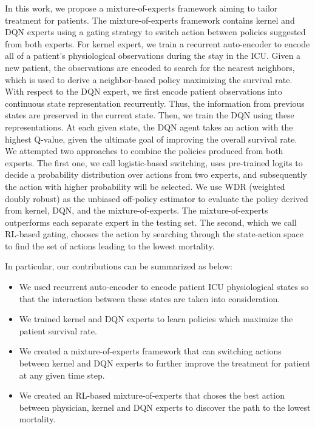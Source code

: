 \documentclass[letterpaper]{article}
\begin{document}
In this work, we propose a mixture-of-experts framework aiming to tailor treatment for patients. The mixture-of-experts framework contains kernel and DQN experts using a gating strategy to switch action between policies suggested from both experts. For kernel expert, we train a recurrent auto-encoder to encode all of a patient's physiological observations during the stay in the ICU. Given a new patient, the  observations are encoded to search for the nearest neighbors, which is used to derive a neighbor-based policy maximizing the survival rate. With respect to the DQN expert, we first encode patient observations into continuous state representation recurrently. Thus, the information from previous states are preserved in the current state. Then, we train the DQN using these representations. At each given state, the DQN agent takes an action with the highest Q-value, given the ultimate goal of improving the overall survival rate. We attempted two approaches to combine the policies produced from both experts. The first one, we call logistic-based switching, uses pre-trained logits to decide a probability distribution over actions from two experts, and subsequently the action with higher probability will be selected. We use WDR (weighted doubly robust) \cite{thomas2016data} as the unbiased off-policy estimator to evaluate the policy derived from kernel, DQN, and the mixture-of-experts. The mixture-of-experts outperforms each separate expert in the testing set. The second, which we call RL-based gating, chooses the action by searching through the state-action space to find the set of actions leading to the lowest mortality. 

In particular, our contributions can be summarized as below:

\begin{itemize}
\item We used recurrent auto-encoder to encode patient ICU physiological states so that the interaction between these states are taken into consideration.
\item We trained kernel and DQN experts to learn policies which maximize the patient survival rate. 
\item We created a mixture-of-experts framework that can switching actions between kernel and DQN experts to further improve the treatment for patient at any given time step.
\item We created an RL-based mixture-of-experts that choses the best action between physician, kernel and DQN
experts to discover the path to the lowest mortality.
\end{itemize}
\end{document}
